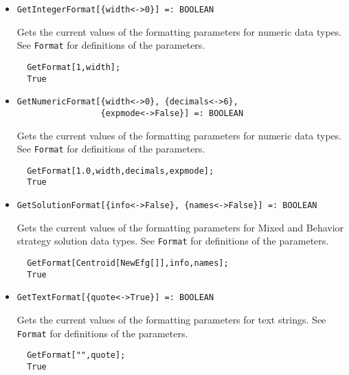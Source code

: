 \begin{itemize}
\item{}
\protect \large \begin{verbatim}
GetIntegerFormat[{width<->0}] =: BOOLEAN 
\end{verbatim} \normalsize

\bd 
Gets the current values of the formatting parameters for numeric
data types.  See \verb+Format+ for definitions of the
parameters.  
\begin{verbatim}
  GetFormat[1,width];
  True
\end{verbatim} 
\ed

\item{}
\protect \large \begin{verbatim}
GetNumericFormat[{width<->0}, {decimals<->6}, 
                 {expmode<->False}] =: BOOLEAN 
\end{verbatim} \normalsize

\bd 
Gets the current values of the formatting parameters for numeric
data types.  See \verb+Format+ for definitions of the
parameters.  
\begin{verbatim}
  GetFormat[1.0,width,decimals,expmode];
  True
\end{verbatim} 
\ed

\item{}
\protect \large \begin{verbatim}
GetSolutionFormat[{info<->False}, {names<->False}] =: BOOLEAN 
\end{verbatim} \normalsize

\bd
Gets the current values of the formatting parameters for Mixed and
Behavior strategy solution data types.  See \verb+Format+ for
definitions of the parameters.  
\begin{verbatim}
  GetFormat[Centroid[NewEfg[]],info,names];
  True
\end{verbatim} 
\ed

\item{}
\protect \large \begin{verbatim}
GetTextFormat[{quote<->True}] =: BOOLEAN 
\end{verbatim} \normalsize

\bd
Gets the current values of the formatting parameters for text strings.  See
\verb+Format+ for definitions of the parameters. 
\begin{verbatim}
  GetFormat["",quote];
  True
\end{verbatim} 
\ed



\end{itemize}
